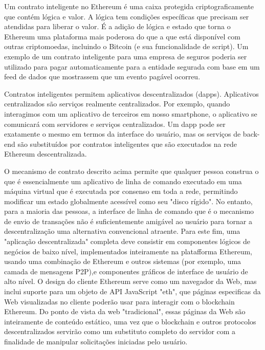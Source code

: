 Um contrato inteligente no Ethereum é uma caixa protegida criptograficamente que contém lógica e valor. A lógica tem condições específicas que precisam ser atendidas para liberar o valor. É a adição de lógica e estado que torna o Ethereum uma plataforma mais poderosa do que a que está disponível com outras criptomoedas, incluindo o Bitcoin (e sua funcionalidade de script). Um exemplo de um contrato inteligente para uma empresa de seguros poderia ser utilizado para pagar automaticamente para a entidade segurada com base em um feed de dados que mostrassem que um evento pagável ocorreu.\cite{blockchain_pratical_guide}

Contratos inteligentes permitem aplicativos descentralizados (dapps). Aplicativos centralizados são serviços realmente centralizados. Por exemplo, quando interagimos com um aplicativo de terceiros em nosso smartphone, o aplicativo se comunicará com servidores e serviços centralizados. Um dapp pode ser exatamente o mesmo em termos da interface do usuário, mas os serviços de back-end são substituídos por contratos inteligentes que são executados na rede Ethereum descentralizada.\cite{blockchain_pratical_guide}

O mecanismo de contrato descrito acima permite que qualquer pessoa construa o que é essencialmente um aplicativo de linha de comando executado em uma máquina virtual que é executada por consenso em toda a rede, permitindo modificar um estado globalmente acessível como seu "disco rígido".
No entanto, para a maioria das pessoas, a interface de linha de comando que é o mecanismo de envio de transações não é suficientemente amigável ao usuário para tornar a descentralização uma alternativa convencional atraente. Para este fim, uma "aplicação descentralizada" completa deve consistir em
componentes lógicos de negócios de baixo nível, implementados inteiramente na platafforma Ethereum, usando uma combinação de Ethereum e outros sistemas (por exemplo, uma camada de mensagens P2P),e componentes gráficos de interface de usuário de alto nível. O design do cliente Ethereum serve como um navegador da Web, mas inclui suporte para um objeto de API JavaScript "eth", que páginas especificas da Web visualizadas no cliente poderão usar para interagir com o blockchain Ethereum. Do ponto de vista da web "tradicional", essas páginas da Web são inteiramente de conteúdo estático, uma vez que o blockchain e outros protocolos descentralizados servirão como um substituto completo do servidor com a finalidade de manipular solicitações iniciadas pelo usuário.\cite{ethereum_white_paper}


